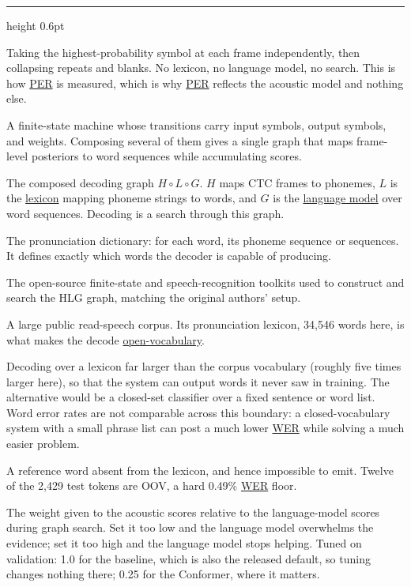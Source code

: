 \documentclass{article}
\providecommand{\textls}[2][]{#2}
\newcommand{\cathead}[1]{%
  \par\addvspace{15pt}\needspace{5\baselineskip}%
  \noindent{\normalsize\scshape\bfseries\textls[70]{#1}}\par
  \vspace{2.5pt}%
  {\color{rulegray}\hrule height 0.6pt}%
  \par\addvspace{8pt}%
}
\DeclareRobustCommand{\glref}[2]{\hyperlink{gl:#1}{\textcolor{glosslink}{#2}}}
\newcommand{\glentry}[2]{\item[\hypertarget{gl:#1}{#2}]}
\newenvironment{glosslist}
  {\begin{description}[style=nextline,leftmargin=2.1em,labelindent=0pt,
      itemsep=5pt,parsep=0pt,topsep=2pt,font=\normalfont\bfseries]}
  {\end{description}}
\DeclareRobustCommand{\wer}{\glref{wer}{WER}}
\DeclareRobustCommand{\per}{\glref{per}{PER}}
\begin{document}
\cathead{Decoding}
\begin{glosslist}

\glentry{greedy}{Greedy decoding}
Taking the highest-probability symbol at each frame independently, then collapsing repeats and blanks.
No lexicon, no language model, no search. This is how \per{} is measured, which is why \per{} reflects
the acoustic model and nothing else.

\glentry{wfst}{WFST \textnormal{(weighted finite-state transducer)}}
A finite-state machine whose transitions carry input symbols, output symbols, and weights. Composing
several of them gives a single graph that maps frame-level posteriors to word sequences while
accumulating scores.

\glentry{hlg}{HLG}
The composed decoding graph $H \circ L \circ G$. $H$ maps CTC frames to phonemes, $L$ is the
\glref{lexicon}{lexicon} mapping phoneme strings to words, and $G$ is the \glref{lm}{language model}
over word sequences. Decoding is a search through this graph.

\glentry{lexicon}{Lexicon}
The pronunciation dictionary: for each word, its phoneme sequence or sequences. It defines exactly which
words the decoder is capable of producing.

\glentry{k2}{k2 and icefall}
The open-source finite-state and speech-recognition toolkits used to construct and search the HLG graph,
matching the original authors' setup.

\glentry{librispeech}{LibriSpeech}
A large public read-speech corpus. Its pronunciation lexicon, 34{,}546 words here, is what makes the
decode \glref{openvocab}{open-vocabulary}.

\glentry{openvocab}{Open vocabulary}
Decoding over a lexicon far larger than the corpus vocabulary (roughly five times larger here), so that
the system can output words it never saw in training. The alternative would be a closed-set classifier
over a fixed sentence or word list. Word error rates are not comparable across this boundary: a
closed-vocabulary system with a small phrase list can post a much lower \wer{} while solving a much
easier problem.

\glentry{oov}{OOV \textnormal{(out of vocabulary)}}
A reference word absent from the lexicon, and hence impossible to emit. Twelve of the 2{,}429 test tokens
are OOV, a hard 0.49\% \wer{} floor.

\glentry{scale}{Acoustic scale}
The weight given to the acoustic scores relative to the language-model scores during graph search. Set it
too low and the language model overwhelms the evidence; set it too high and the language model stops
helping. Tuned on validation: 1.0 for the baseline, which is also the released default, so tuning changes
nothing there; 0.25 for the Conformer, where it matters.


\end{glosslist}
\end{document}
